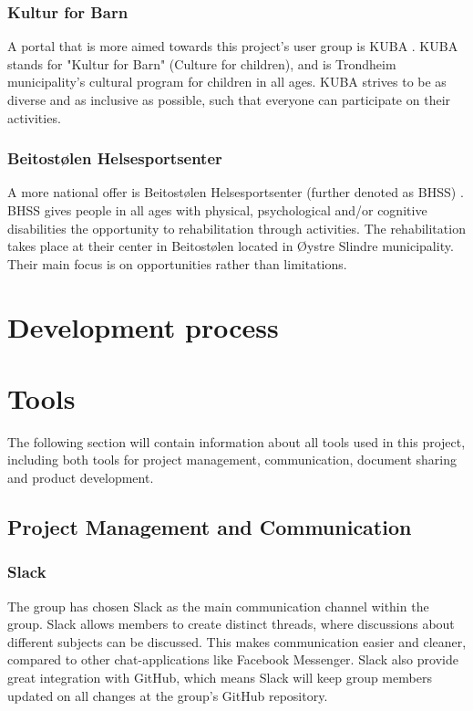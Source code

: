\subsubsection{Kultur for Barn}
A portal that is more aimed towards this project's user group is KUBA \cite{KUBA}. KUBA stands for "Kultur for Barn" (Culture for children), and is Trondheim municipality's cultural program for children in all ages. KUBA strives to be as diverse and as inclusive as possible, such that everyone can participate on their activities.

\subsubsection{Beitostølen Helsesportsenter}
A more national offer is Beitostølen Helsesportsenter (further denoted as BHSS) \cite{BHSS}. BHSS gives people in all ages with physical, psychological and/or cognitive disabilities the opportunity to rehabilitation through activities. The rehabilitation takes place at their center in Beitostølen located in Øystre Slindre municipality. Their main focus is on opportunities rather than limitations.  


\section{Development process}

\section{Tools}
\label{tools}
The following section will contain information about all tools used in this project, including both tools for project management, communication, document sharing and product development.

\subsection{Project Management and Communication}

\subsubsection{Slack}
The group has chosen Slack \cite{Slack} as the main communication channel within the group. Slack allows members to create distinct threads, where discussions about different subjects can be discussed. This makes communication easier and cleaner, compared to other chat-applications like Facebook Messenger. Slack also provide great integration with GitHub, which means Slack will keep group members updated on all changes at the group's GitHub repository. 

